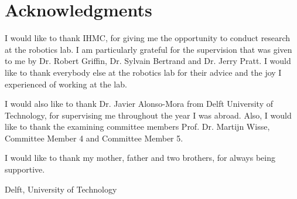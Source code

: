 %
\chapter{Acknowledgments}%

I would like to thank \ac{IHMC}, for giving me the opportunity to conduct research at the robotics lab. I am particularly grateful for the supervision that was given to me by Dr. Robert Griffin, Dr. Sylvain Bertrand and Dr. Jerry Pratt. I would like to thank everybody else at the robotics lab for their advice and the joy I experienced of working at the lab. 

I would also like to thank Dr. Javier Alonso-Mora from Delft University of Technology, for supervising me throughout the year I was abroad. Also, I would like to thank the examining committee members Prof. Dr. Martijn Wisse, Committee Member 4 and Committee Member 5.

I would like to thank my mother, father and two brothers, for always being supportive.

\vspace*{15mm}

Delft, University of Technology \hfill \mscname \\
\mscdate